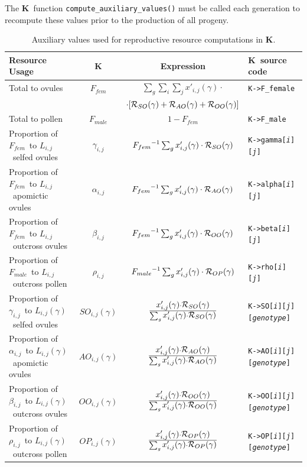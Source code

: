\documentclass[10pt,twoside,a4paper,fleqn]{report}
\numberwithin{equation}{section}  %
\newcommand{\K}{{\bf K}}
\newcommand{\Kmember}[1]{\mbox{{\tt K->#1}}}
\newcommand{\Kmemberij}[3]{\mbox{{\tt K->#1[{\it #2}\/][{\it #3}\/]}}}
\newcommand{\Kmemberijk}[4]{\mbox{{\tt K->#1[{\it #2}\/][{\it #3}\/][{\it #4}\/]}}}
\newcommand{\xpijg}{\mbox{$x'_{i,j}(\gamma)$}}
\newcommand{\Lij}{\mbox{$L_{i,j}$}}              %
\newcommand{\Lgij}{\mbox{$L_{i,j}(\gamma)$}}     %
\newcommand{\RSOg}{\mbox{${\cal R}_{SO}(\gamma)$}}
\newcommand{\RAOg}{\mbox{${\cal R}_{AO}(\gamma)$}}
\newcommand{\ROOg}{\mbox{${\cal R}_{OO}(\gamma)$}}
\newcommand{\ROPg}{\mbox{${\cal R}_{OP}(\gamma)$}}
\newcommand{\Ffemale}{\mbox{$F_{fem}$}}
\newcommand{\Fmale}{\mbox{$F_{male}$}}
\newcommand{\betaij}{\mbox{$\beta_{i,j}$}}
\newcommand{\gammaij}{\mbox{$\gamma_{i,j}$}}
\newcommand{\alphaij}{\mbox{$\alpha_{i,j}$}}
\newcommand{\rhoij}{\mbox{$\rho_{i,j}$}}
\newcommand{\SOijg}{\mbox{$SO_{i,j}(\gamma)$}}
\newcommand{\AOijg}{\mbox{$AO_{i,j}(\gamma)$}}
\newcommand{\OOijg}{\mbox{$OO_{i,j}(\gamma)$}}
\newcommand{\OPijg}{\mbox{$OP_{i,j}(\gamma)$}}
\begin{document}
{The \K\ function \lstinline{compute_auxiliary_values()} must be called each generation to recompute these values prior to the production of all progeny.

\begin{table}
	\begin{center}
	  {\small
		\begin{tabular}{@{}p{1.9in}|c|c|l@{}}
Resource Usage             & \K            & Expression       & \K\ source code \\
\hline %
\hline %
Total to ovules & \Ffemale & $\sum_{g}{ \sum_{i}{ \sum_{j}{ \xpijg \cdot } } }$ & \Kmember{F\_female} \\
                           &              & $\cdot [\RSOg+\RAOg+\ROOg]$ &  \\
%
Total to pollen & \Fmale   & $1-\Ffemale$ & \Kmember{F\_male} \\
\hline %
Proportion of \Ffemale\ to \Lij\ selfed ovules & \gammaij & $\Ffemale^{-1}\sum_{g}{\xpijg\cdot\RSOg}$ & \Kmemberij{gamma}{i}{j} \\
%
Proportion of \Ffemale\ to \Lij\ apomictic ovules	& \alphaij & $\Ffemale^{-1}\sum_{g}{\xpijg\cdot\RAOg}$ & \Kmemberij{alpha}{i}{j}   \\
%
Proportion of \Ffemale\ to \Lij\ outcross ovules & \betaij  & $\Ffemale^{-1}\sum_{g}{\xpijg\cdot\ROOg}$ & \Kmemberij{beta}{i}{j}  \\
%
Proportion of \Fmale\ to \Lij\ outcross pollen & \rhoij   & $\Fmale^{-1}\sum_{g}{\xpijg\cdot\ROPg}$   & \Kmemberij{rho}{i}{j}  \\ 
\hline %
Proportion of \gammaij\ to \Lgij\ selfed ovules & \SOijg   & $\frac{\xpijg\cdot\RSOg}{\sum_{g}{\xpijg\cdot\RSOg}}$ & \Kmemberijk{SO}{i}{j}{genotype}  \\
%
Proportion of \alphaij\ to \Lgij\ apomictic ovules & \AOijg   & $\frac{\xpijg\cdot\RAOg}{\sum_{g}{\xpijg\cdot\RAOg}}$ & \Kmemberijk{AO}{i}{j}{genotype}  \\
%
Proportion of \betaij\ to \Lgij\ outcross ovules & \OOijg   & $\frac{\xpijg\cdot\ROOg}{\sum_{g}{\xpijg\cdot\ROOg}}$ & \Kmemberijk{OO}{i}{j}{genotype}  \\
%
Proportion of \rhoij\ to \Lgij\ outcross pollen & \OPijg   & $\frac{\xpijg\cdot\ROPg}{\sum_{g}{\xpijg\cdot\ROPg}}$ & \Kmemberijk{OP}{i}{j}{genotype}  \\
		\end{tabular}
		}
	\end{center}
	\caption{Auxiliary values used for reproductive resource computations in \K.}
	\label{tab:kondrashov:auxiliaries}
\end{table}

}
\end{document}
